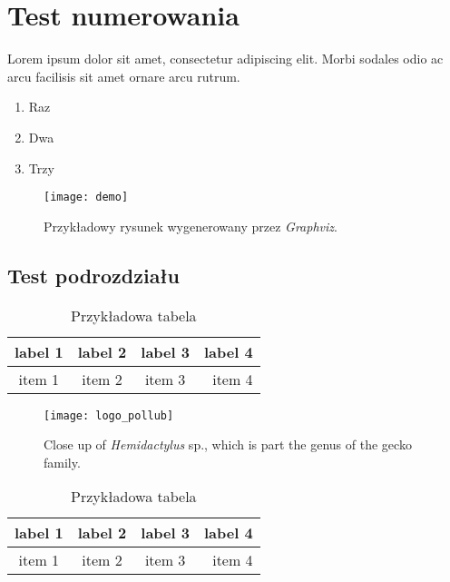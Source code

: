 \section{Test numerowania}

Lorem ipsum dolor sit amet, consectetur adipiscing elit.\cite{test1} Morbi sodales odio ac arcu facilisis sit amet ornare arcu rutrum.\cite{test1,test2}

\begin{enumerate}
  \item{Raz}
  \item{Dwa}
  \item{Trzy}
\end{enumerate}

\lipsum[2]

\begin{figure}[ht]
  \centering
  \texttt{[image: demo]}
  \caption[Przykładowy rysunek]%
  {Przykładowy rysunek wygenerowany przez \emph{Graphviz}.}
\end{figure}

\subsection{Test podrozdziału}

\lipsum[3]

\begin{table}[h]
  \center
  \caption{Przykładowa tabela}
  \label{my_table}
  \begin{tabular}{ | c | c | c | r | }
    \hline
  label 1 & label 2 & label 3 & label 4 \\
  \hline
  item 1  & item 2  & item 3  & item 4  \\
  \hline
  \end{tabular}
\end{table}

\lipsum[4]

\begin{figure}[ht]
  \centering
  \texttt{[image: logo\_pollub]}
  \caption[Close up of \textit{Hemidactylus} sp.]%
  {Close up of \textit{Hemidactylus} sp., which is
  part the genus of the gecko family.}
\end{figure}

\lipsum[5]

\begin{table}[h]
  \center
  \caption{Przykładowa tabela}
  \label{my_table}
  \begin{tabular}{ | c | c | c | r | }
    \hline
  label 1 & label 2 & label 3 & label 4 \\
  \hline
  item 1  & item 2  & item 3  & item 4  \\
  \hline
  \end{tabular}
\end{table}


